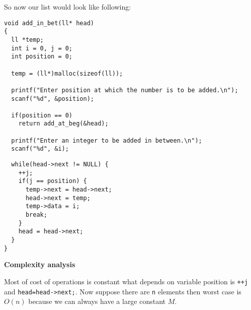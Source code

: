 \documentclass[aspectratio=1610]{beamer}
\begin{document}
\begin{frame}[fragile]
So now our list would look like following:
\begin{center}
\end{center}
\begin{verbatim}
void add_in_bet(ll* head)
{
  ll *temp;
  int i = 0, j = 0;
  int position = 0;

  temp = (ll*)malloc(sizeof(ll));

  printf("Enter position at which the number is to be added.\n");
  scanf("%d", &position);

  if(position == 0)
    return add_at_beg(&head);

  printf("Enter an integer to be added in between.\n");
  scanf("%d", &i);
\end{verbatim}
\end{frame}
\begin{frame}[fragile]
\begin{verbatim}
  while(head->next != NULL) {
    ++j;
    if(j == position) {
      temp->next = head->next;
      head->next = temp;
      temp->data = i;
      break;
    }
    head = head->next;
  }
}
\end{verbatim}

\vspace*{0.5cm}
\textbf{Complexity analysis}
\vspace*{0.5cm}

Most of cost of operations is constant what depends on variable position
is \texttt{++j} and \texttt{head=head->next;}. Now suppose there are
\texttt{n} elements then worst case is $O(n)$ because we can always have a
large constant $M$.
\end{frame}
\end{document}
